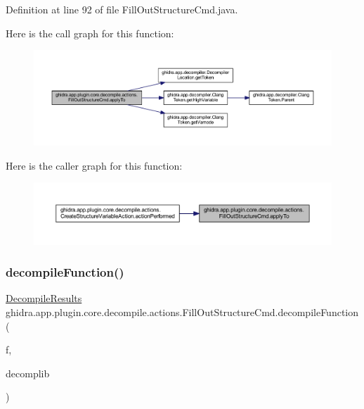 Definition at line 92 of file Fill\+Out\+Structure\+Cmd.\+java.

Here is the call graph for this function\+:
\nopagebreak
\begin{figure}[H]
\begin{center}
\leavevmode
\includegraphics[width=350pt]{classghidra_1_1app_1_1plugin_1_1core_1_1decompile_1_1actions_1_1_fill_out_structure_cmd_a42a968c8b0faa75882024395bd0eadd2_cgraph}
\end{center}
\end{figure}
Here is the caller graph for this function\+:
\nopagebreak
\begin{figure}[H]
\begin{center}
\leavevmode
\includegraphics[width=350pt]{classghidra_1_1app_1_1plugin_1_1core_1_1decompile_1_1actions_1_1_fill_out_structure_cmd_a42a968c8b0faa75882024395bd0eadd2_icgraph}
\end{center}
\end{figure}
\mbox{\label{classghidra_1_1app_1_1plugin_1_1core_1_1decompile_1_1actions_1_1_fill_out_structure_cmd_ad1fdf8d5d8ee9586bfec86f62469c212}} 
\subsubsection{\texorpdfstring{decompileFunction()}{decompileFunction()}}
{\footnotesize\ttfamily \mbox{\hyperlink{classghidra_1_1app_1_1decompiler_1_1_decompile_results}{Decompile\+Results}} ghidra.\+app.\+plugin.\+core.\+decompile.\+actions.\+Fill\+Out\+Structure\+Cmd.\+decompile\+Function (\begin{DoxyParamCaption}\item[{Function}]{f,  }\item[{\mbox{\hyperlink{classghidra_1_1app_1_1decompiler_1_1_decomp_interface}{Decomp\+Interface}}}]{decomplib }\end{DoxyParamCaption})\hspace{0.3cm}{\ttfamily [inline]}}



